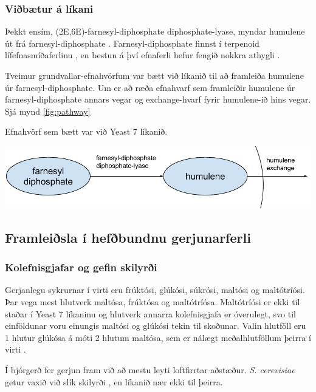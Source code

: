 \documentclass[11pt]{article}
\makeatletter
\newenvironment{figureonecolumn}{\begin{minipage}{\linewidth}\begin{center}\def\@captype{figure}}{\end{center}\end{minipage}}
\makeatother
\begin{document}
\begin{multicols}{2}
\subsubsection{Viðbætur á líkani}
Þekkt ensím, (2E,6E)-farnesyl-diphosphate diphosphate-lyase, myndar humulene út frá farnesyl-diphosphate \cite[KEGG: R08373]{Kanehisa01012000}. Farnesyl-diphosphate finnst í terpenoid lífefnasmíðaferlinu \cite[KEGG: rn00900]{Kanehisa01012000}, en bestun á því efnaferli hefur fengið nokkra athygli \cite{BIT:BIT21216,misawa2011pathway,asadollahi2008production}.

Tveimur grundvallar-efnahvörfum var bætt við líkanið til að framleiða humulene úr farnesyl-diphosphate.
Um er að ræða efnahvarf sem framleiðir humulene úr farnesyl-diphosphate annars vegar og exchange-hvarf fyrir humulene-ið hins vegar. Sjá mynd \ref{fig:pathway}

\begin{figureonecolumn}
\caption[Viðbætur við Yeast 7]{Efnahvörf sem bætt var við Yeast 7 líkanið.}
\label{fig:pathway}
\includegraphics[width=\linewidth]{Pics/HumuleneAddition}
\end{figureonecolumn}
\subsection{Framleiðsla í hefðbundnu gerjunarferli}
\label{sec:hefdbundid}
\subsubsection{Kolefnisgjafar og gefin skilyrði}
Gerjanlegu sykrurnar í virti eru frúktósi, glúkósi, súkrósi, maltósi og maltótríósi. Þar vega mest hlutverk maltósa, frúktósa og maltótríósa. Maltótríósi er ekki til staðar í Yeast 7 líkaninu og hlutverk annarra kolefnisgjafa er óverulegt, svo til einföldunar voru einungis maltósi og glúkósi tekin til skoðunar. Valin hlutföll eru 1 hlutur glúkósa á móti 2 hlutum maltósa, sem er nálægt meðalhlutföllum þeirra í virti \cite{otter1967determination}. 

Í bjórgerð fer gerjun fram við að mestu leyti loftfirrtar aðstæður. \emph{S. cerevisiae} getur vaxið við slík skilyrði \cite{ishtar2007factors}, en líkanið nær ekki til þeirra.

\end{multicols}
\end{document}
